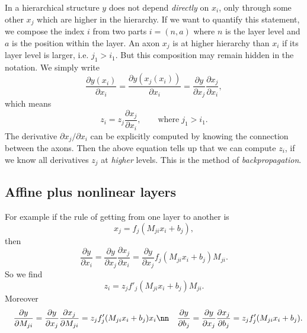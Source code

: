 \documentclass[10pt,a4paper]{article}
\begin{document}
In a hierarchical structure $y$ does not depend \emph{directly} on $x_i$, only through some other $x_j$ which are higher in the hierarchy. If we want to quantify this statement, we compose the index $i$ from two parts $i=(n,a)$ where $n$ is the layer level and $a$ is the position within the layer. An axon $x_j$ is at higher hierarchy than $x_i$ if its layer level is larger, i.e. $j_1>i_1$. But this composition may remain hidden in the notation. We simply write
\begin{equation}
\label{eq:f1}
\frac{\partial y(x_i)}{\partial x_i} = \frac{\partial y(x_j(x_i))}{\partial x_i} =\frac{\partial y}{\partial x_j} \frac{\partial x_j}{\partial x_i},
\end{equation}
which means
\begin{equation}
\label{eq:f2}
z_i = z_j \frac{\partial x_j}{\partial x_i},\qquad \mathrm{where}\; j_1>i_1.
\end{equation}
The derivative ${\partial x_j}/{\partial x_i}$ can be explicitly computed by knowing the connection between the axons. Then the above equation tells up that we can compute $z_i$, if we know all derivatives $z_j$ at \emph{higher} levels. This is the method of \emph{backpropagation}.

\subsection{Affine plus nonlinear layers}

For example if the rule of getting from one layer to another is
\begin{equation}
x_j= f_j\left(M_{ji} x_i + b_j \right),
\end{equation}
then
\begin{equation}
\frac{\partial y}{\partial x_i} = \frac{\partial y}{\partial x_j} \frac{\partial x_j}{\partial x_i} = \frac{\partial y}{\partial x_j} f_j(M_{ji} x_i + b_j) M_{ji}.
\end{equation}
So we find
\begin{equation}
z_i = z_j f'_j(M_{ji} x_i + b_j) M_{ji}.
\end{equation}
Moreover
\begin{eqnarray}
&& \frac{\partial y}{\partial M_{ji}} = \frac{\partial y}{\partial x_j} \frac{\partial x_j}{\partial M_{ji}} = z_j f'_j(M_{ji} x_i + b_j) x_i \nn
&& \frac{\partial y}{\partial b_j} = \frac{\partial y}{\partial x_j} \frac{\partial x_j}{\partial b_j} = z_j f'_j(M_{ji} x_i + b_j).
\end{eqnarray}
\end{document}
